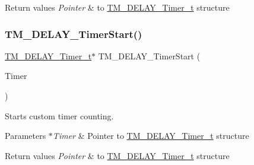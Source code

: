 \begin{DoxyRetVals}{Return values}
{\em Pointer} & to \hyperlink{group___t_m___d_e_l_a_y___typedefs_gaf0beeb077a757f34c8b176464d9a0e85}{T\+M\+\_\+\+D\+E\+L\+A\+Y\+\_\+\+Timer\+\_\+t} structure \\
\hline
\end{DoxyRetVals}
\mbox{\label{group___t_m___d_e_l_a_y___timer___functions_ga3d811bc37a1b9f975ba3738f577021dc}} 
\subsubsection{\texorpdfstring{T\+M\+\_\+\+D\+E\+L\+A\+Y\+\_\+\+Timer\+Start()}{TM\_DELAY\_TimerStart()}}
{\footnotesize\ttfamily \hyperlink{group___t_m___d_e_l_a_y___typedefs_gaf0beeb077a757f34c8b176464d9a0e85}{T\+M\+\_\+\+D\+E\+L\+A\+Y\+\_\+\+Timer\+\_\+t}$\ast$ T\+M\+\_\+\+D\+E\+L\+A\+Y\+\_\+\+Timer\+Start (\begin{DoxyParamCaption}\item[{\hyperlink{group___t_m___d_e_l_a_y___typedefs_gaf0beeb077a757f34c8b176464d9a0e85}{T\+M\+\_\+\+D\+E\+L\+A\+Y\+\_\+\+Timer\+\_\+t} $\ast$}]{Timer }\end{DoxyParamCaption})}



Starts custom timer counting. 


\begin{DoxyParams}{Parameters}
{\em $\ast$\+Timer} & Pointer to \hyperlink{group___t_m___d_e_l_a_y___typedefs_gaf0beeb077a757f34c8b176464d9a0e85}{T\+M\+\_\+\+D\+E\+L\+A\+Y\+\_\+\+Timer\+\_\+t} structure \\
\hline
\end{DoxyParams}

\begin{DoxyRetVals}{Return values}
{\em Pointer} & to \hyperlink{group___t_m___d_e_l_a_y___typedefs_gaf0beeb077a757f34c8b176464d9a0e85}{T\+M\+\_\+\+D\+E\+L\+A\+Y\+\_\+\+Timer\+\_\+t} structure \\
\hline
\end{DoxyRetVals}
\mbox{\label{group___t_m___d_e_l_a_y___timer___functions_ga860e1fa6c7ae18b54d89425ccbd280a5}} 
